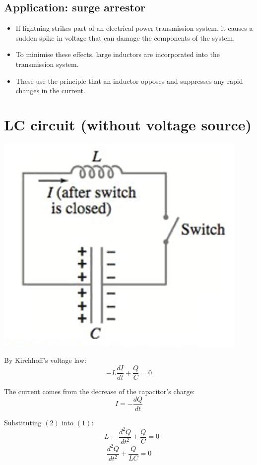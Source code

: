 \documentclass[11pt]{article}
\begin{document}
\subsection{Application: surge arrestor}
\label{sec:org71101ed}
\begin{itemize}
\item If lightning strikes part of an electrical power transmission system, it causes a sudden spike in voltage that can damage the components of the system.
\item To minimise these effects, large inductors are incorporated into the transmission system.
\item These use the principle that an inductor opposes and suppresses any rapid changes in the current.
\end{itemize}
\section{LC circuit (without voltage source)}
\label{sec:org1632cf9}

\begin{center}
\includegraphics[scale=0.8]{./images/lc-circuit.png}
\end{center}

By Kirchhoff's voltage law:
\[-L \frac{dI}{dt} + \frac{Q}{C} = 0 \tag{1}\]

The current comes from the decrease of the capacitor's charge:
\[I = - \frac{dQ}{dt} \tag{2}\]

Substituting \((2)\) into \((1)\):
\[- L \cdot -\frac{d^2Q}{dt^2} + \frac{Q}{C} = 0\]
\[\frac{d^2Q}{dt^2} + \frac{Q}{LC} = 0 \tag{3}\]
\end{document}
